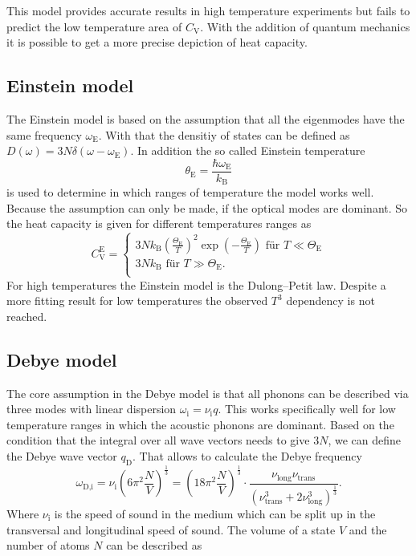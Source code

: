 This model provides accurate results in high temperature experiments but fails to predict the low temperature area of $C_\text{V}$.
With the addition of quantum mechanics it is possible to get a more precise depiction of heat capacity.

\subsection{Einstein model}
\label{ssec:theory3}

The Einstein model is based on the assumption that all the eigenmodes have the same frequency $\omega_\text{E}$.
With that the densitiy of states can be defined as $D (\omega) = 3 N \delta (\omega - \omega_\text{E})$.
In addition the so called Einstein temperature 
\begin{equation}
    \theta_\text{E} = \frac{\hbar \omega_\text{E}}{k_\text{B}}
    \label{eq:einstein}
\end{equation}
is used to determine in which ranges of temperature the model works well.
Because the assumption can only be made, if the optical modes are dominant.
So the heat capacity is given for different temperatures ranges as
\begin{equation}
    C_\text{V}^\text{E} =
      \begin{cases}
        3 N k_\text{B} \left( \frac{\Theta_\text{E}}{T}   \right)^2 \exp(- \frac{\Theta_\text{E}}{T}) \,\, \text{für} \,\,  T \ll \Theta_\text{E}\\
        3 N k_\text{B} \,\, \text{für} \,\, T \gg \Theta_\text{E}.\\
        \end{cases}
\end{equation}
For high temperatures the Einstein model is the Dulong–Petit law.
Despite a more fitting result for low temperatures the observed $T^3$ dependency is not reached.

\subsection{Debye model}
\label{ssec:theory4}

The core assumption in the Debye model is that all phonons can be described via three modes with linear dispersion $\omega_\text{i} = \nu_\text{i} q$.
This works specifically well for low temperature ranges in which the acoustic phonons are dominant.
Based on the condition that the integral over all wave vectors needs to give $3N$, we can define the Debye wave vector $q_\text{D}$.
That allows to calculate the Debye frequency
\begin{equation}
    \omega_\text{D,i} = \nu_\text{i} \left(6 \pi^2 \frac{N}{V} \right)^{\frac{1}{3}} = \left(18 \pi^2 \frac{N}{V} \right)^{\frac{1}{3}} \cdot \frac{\nu_\text{long} \nu_\text{trans}}{\left( \nu_\text{trans}^3 +  2 \nu_\text{long}^3  \right)^{\frac{1}{3}}}.
    \label{eq:debye_freq}
\end{equation}
Where $\nu_\text{i}$ is the speed of sound in the medium which can be split up in the transversal and longitudinal speed of sound.
The volume of a state $V$ and the number of atoms $N$ can be described as

